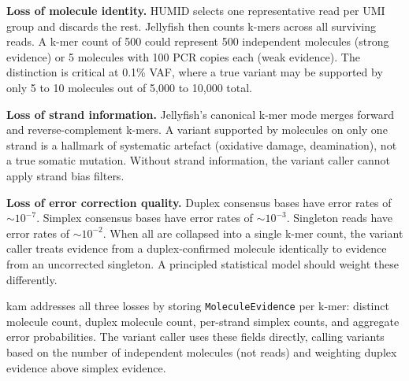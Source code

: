 \textbf{Loss of molecule identity.}
HUMID selects one representative read per UMI group and discards the rest.
Jellyfish then counts k-mers across all surviving reads.
A k-mer count of 500 could represent 500 independent molecules (strong evidence) or 5 molecules with 100 PCR copies each (weak evidence).
The distinction is critical at 0.1\% VAF, where a true variant may be supported by only 5 to 10 molecules out of 5{,}000 to 10{,}000 total.

\textbf{Loss of strand information.}
Jellyfish's canonical k-mer mode merges forward and reverse-complement k-mers.
A variant supported by molecules on only one strand is a hallmark of systematic artefact (oxidative damage, deamination), not a true somatic mutation.
Without strand information, the variant caller cannot apply strand bias filters.

\textbf{Loss of error correction quality.}
Duplex consensus bases have error rates of ${\sim}10^{-7}$.
Simplex consensus bases have error rates of ${\sim}10^{-3}$.
Singleton reads have error rates of ${\sim}10^{-2}$.
When all are collapsed into a single k-mer count, the variant caller treats evidence from a duplex-confirmed molecule identically to evidence from an uncorrected singleton.
A principled statistical model should weight these differently.

kam addresses all three losses by storing \texttt{MoleculeEvidence} per k-mer: distinct molecule count, duplex molecule count, per-strand simplex counts, and aggregate error probabilities.
The variant caller uses these fields directly, calling variants based on the number of independent molecules (not reads) and weighting duplex evidence above simplex evidence.

